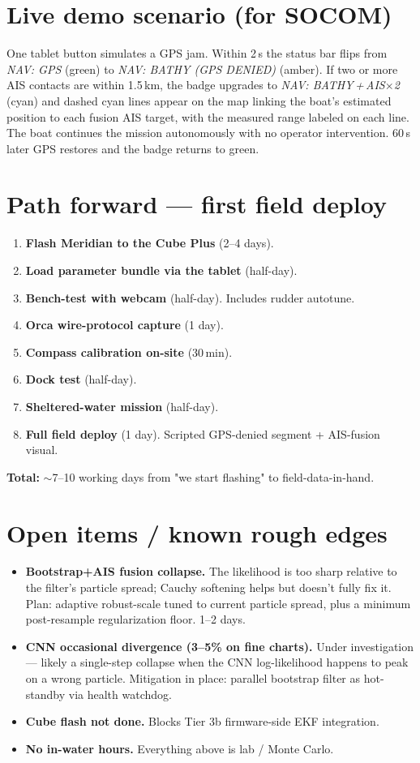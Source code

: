 \documentclass[10pt,a4paper]{article}
\begin{document}
\section{Live demo scenario (for SOCOM)}
One tablet button simulates a GPS jam. Within 2\,s the status bar flips
from \textit{NAV: GPS} (green) to \textit{NAV: BATHY (GPS DENIED)}
(amber). If two or more AIS contacts are within 1.5\,km, the badge
upgrades to \textit{NAV: BATHY\,+\,AIS$\times$2} (cyan) and dashed cyan
lines appear on the map linking the boat's estimated position to each
fusion AIS target, with the measured range labeled on each line. The
boat continues the mission autonomously with no operator intervention.
60\,s later GPS restores and the badge returns to green.

\section{Path forward — first field deploy}
\begin{enumerate}[leftmargin=*, itemsep=3pt]
\item \textbf{Flash Meridian to the Cube Plus} (2--4 days).
\item \textbf{Load parameter bundle via the tablet} (half-day).
\item \textbf{Bench-test with webcam} (half-day). Includes rudder autotune.
\item \textbf{Orca wire-protocol capture} (1 day).
\item \textbf{Compass calibration on-site} (30\,min).
\item \textbf{Dock test} (half-day).
\item \textbf{Sheltered-water mission} (half-day).
\item \textbf{Full field deploy} (1 day). Scripted GPS-denied segment + AIS-fusion visual.
\end{enumerate}
\textbf{Total:} $\sim$7--10 working days from "we start flashing" to
field-data-in-hand.

\section{Open items / known rough edges}
\begin{itemize}
\item \textbf{Bootstrap+AIS fusion collapse.} The likelihood is too sharp relative to the filter's particle spread; Cauchy softening helps but doesn't fully fix it. Plan: adaptive robust-scale tuned to current particle spread, plus a minimum post-resample regularization floor. 1--2 days.
\item \textbf{CNN occasional divergence (3--5\% on fine charts).} Under investigation — likely a single-step collapse when the CNN log-likelihood happens to peak on a wrong particle. Mitigation in place: parallel bootstrap filter as hot-standby via health watchdog.
\item \textbf{Cube flash not done.} Blocks Tier 3b firmware-side EKF integration.
\item \textbf{No in-water hours.} Everything above is lab / Monte Carlo.
\end{itemize}
\end{document}
